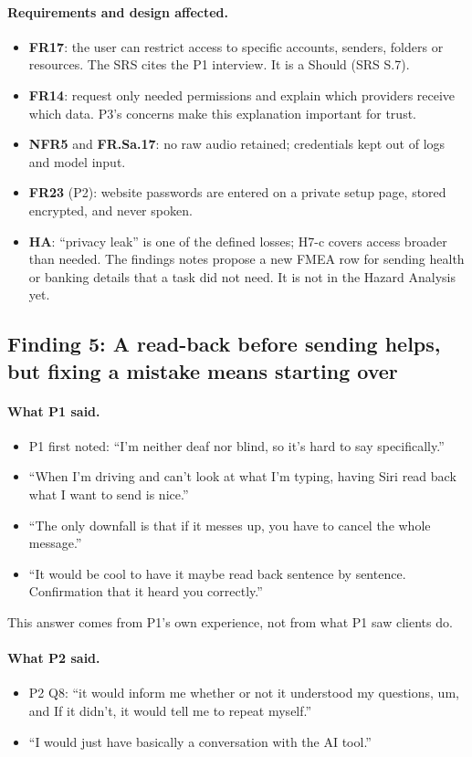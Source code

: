 \documentclass[12pt, titlepage]{article}
\newcommand{\said}{\paragraph{What P1 said.}}
\newcommand{\saidtwo}{\paragraph{What P2 said.}}
\newcommand{\affects}{\paragraph{Requirements and design affected.}}
\begin{document}
\affects
\begin{itemize}
    \item \textbf{FR17}: the user can restrict access to specific accounts, senders, folders or resources. The SRS cites the P1 interview. It is a Should (SRS S.7).
    \item \textbf{FR14}: request only needed permissions and explain which providers receive which data. P3's concerns make this explanation important for trust.
    \item \textbf{NFR5} and \textbf{FR.Sa.17}: no raw audio retained; credentials kept out of logs and model input.
    \item \textbf{FR23} (P2): website passwords are entered on a private setup page, stored encrypted, and never spoken.
    \item \textbf{HA}: ``privacy leak'' is one of the defined losses; H7-c covers access broader than needed. The findings notes propose a new FMEA row for sending health or banking details that a task did not need. It is not in the Hazard Analysis yet.
\end{itemize}

\subsection{Finding 5: A read-back before sending helps, but fixing a mistake means starting over}

\said
\begin{itemize}
    \item P1 first noted: ``I'm neither deaf nor blind, so it's hard to say specifically.''
    \item ``When I'm driving and can't look at what I'm typing, having Siri read back what I want to send is nice.''
    \item ``The only downfall is that if it messes up, you have to cancel the whole message.''
    \item ``It would be cool to have it maybe read back sentence by sentence. Confirmation that it heard you correctly.''
\end{itemize}

This answer comes from P1's own experience, not from what P1 saw clients do.

\saidtwo
\begin{itemize}
    \item P2 Q8: ``it would inform me whether or not it understood my questions, um, and If it didn't, it would tell me to repeat myself.''
    \item ``I would just have basically a conversation with the AI tool.''
\end{itemize}
\end{document}
